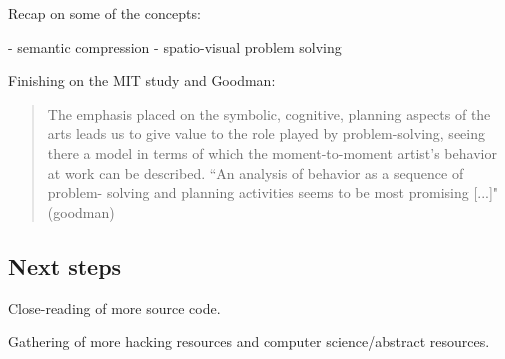 \documentclass{article}
\begin{document}
Recap on some of the concepts:

- semantic compression
- spatio-visual problem solving

Finishing on the MIT study and Goodman:

\begin{quote}
    The emphasis placed on the symbolic, cognitive, planning aspects of the arts leads us to give value to the role played by problem-solving, seeing there a model in terms of which the moment-to-moment artist’s behavior at work can be described. “An analysis of behavior as a sequence of problem- solving and planning activities seems to be most promising [...]" (goodman)
\end{quote}

\subsection{Next steps}

Close-reading of more source code.

Gathering of more hacking resources and computer science/abstract resources.



\end{document}
